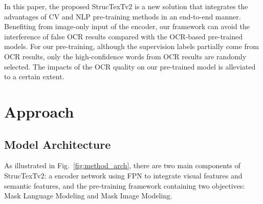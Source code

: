\documentclass{article} %
\begin{document}
In this paper, the proposed StrucTexTv2 is a new solution that integrates the advantages of CV and NLP pre-training methods in an end-to-end manner. Benefiting from image-only input of the encoder, our framework can avoid the interference of false OCR results compared with the OCR-based pre-trained models. For our pre-training, although the supervision labels partially come from OCR results, only the high-confidence words from OCR results are randomly selected. The impacts of the OCR quality on our pre-trained model is alleviated to a certain extent.

\section{Approach}

\subsection{Model Architecture}
As illustrated in Fig.~\ref{fig:method_arch}, there are two main components of StrucTexTv2: a encoder network using FPN to integrate visual features and semantic features, and the pre-training framework containing two objectives: Mask Language Modeling and Mask Image Modeling.
\end{document}
